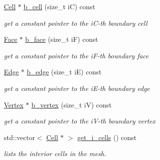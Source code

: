 \begin{DoxyCompactItemize}
\hyperlink{classHArDCore3D_1_1Cell}{Cell} $\ast$ \hyperlink{classHArDCore3D_1_1Mesh_a200361b60684c429e961e6b4f278dfb3}{b\+\_\+cell} (size\+\_\+t iC) const
\begin{DoxyCompactList}\small\item\em get a constant pointer to the i\+C-\/th boundary cell \end{DoxyCompactList}\item 
\mbox{\label{classHArDCore3D_1_1Mesh_aad9ddcb7b2df1b3ac5dcbdd2bf6ab4b2}} 
\hyperlink{classHArDCore3D_1_1Face}{Face} $\ast$ \hyperlink{classHArDCore3D_1_1Mesh_aad9ddcb7b2df1b3ac5dcbdd2bf6ab4b2}{b\+\_\+face} (size\+\_\+t iF) const
\begin{DoxyCompactList}\small\item\em get a constant pointer to the i\+F-\/th boundary face \end{DoxyCompactList}\item 
\mbox{\label{classHArDCore3D_1_1Mesh_a07395cbe8ecaf85abf52f91aef20422f}} 
\hyperlink{classHArDCore3D_1_1Edge}{Edge} $\ast$ \hyperlink{classHArDCore3D_1_1Mesh_a07395cbe8ecaf85abf52f91aef20422f}{b\+\_\+edge} (size\+\_\+t iE) const
\begin{DoxyCompactList}\small\item\em get a constant pointer to the i\+E-\/th boundary edge \end{DoxyCompactList}\item 
\mbox{\label{classHArDCore3D_1_1Mesh_a749b688ccabc6bfcf630b759607ef29a}} 
\hyperlink{classHArDCore3D_1_1Vertex}{Vertex} $\ast$ \hyperlink{classHArDCore3D_1_1Mesh_a749b688ccabc6bfcf630b759607ef29a}{b\+\_\+vertex} (size\+\_\+t iV) const
\begin{DoxyCompactList}\small\item\em get a constant pointer to the i\+V-\/th boundary vertex \end{DoxyCompactList}\item 
std\+::vector$<$ \hyperlink{classHArDCore3D_1_1Cell}{Cell} $\ast$ $>$ \hyperlink{group__Mesh_ga7b88870d7da98e3c1762ea5e2921a0de}{get\+\_\+i\+\_\+cells} () const
\begin{DoxyCompactList}\small\item\em lists the interior cells in the mesh. \end{DoxyCompactList}\item 

\end{DoxyCompactItemize}
